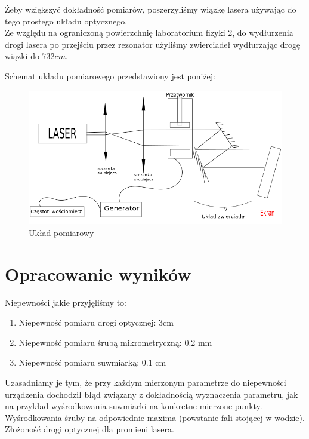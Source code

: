 \documentclass[a4paper,12pt]{article}
\begin{document}
Żeby wziększyć dokładność pomiarów, poszerzyliśmy wiązkę lasera używając do tego prostego układu optycznego.\\
Ze względu na ograniczoną powierzchnię laboratorium fizyki 2, do wydłurzenia drogi lasera po przejściu przez rezonator użyliśmy zwierciadeł wydłurzając drogę wiązki do $732cm$. 

Schemat układu pomiarowego przedstawiony jest poniżej: 

\begin{figure} [H]
  \begin{center}
    \includegraphics[width = 15cm]{Rysunek.png}
    \caption{Układ pomiarowy}
  \end{center}
\end{figure}



\section{Opracowanie wyników}

Niepewności jakie przyjęliśmy to:
\begin{enumerate}
  \item Niepewność pomiaru drogi optycznej: 3cm 
  \item Niepewność pomiaru śrubą mikrometryczną: 0.2 mm 
  \item Niepewność pomiaru suwmiarką: 0.1 cm 
  
\end{enumerate}

Uzasadniamy je tym, że przy każdym mierzonym parametrze do niepewności urządzenia dochodził błąd związany z dokładnością wyznaczenia parametru, jak na przykład wyśrodkowania suwmiarki na konkretne mierzone punkty. Wyśrodkowania śruby na odpowiednie maxima (powstanie fali stojącej w wodzie). Złożoność drogi optycznej dla promieni lasera. 
\end{document}
